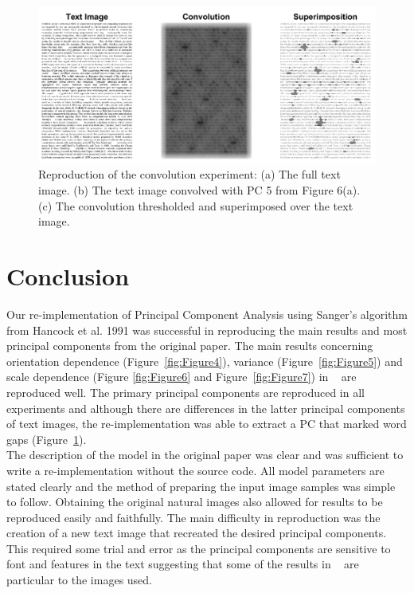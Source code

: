 \begin{figure}
    \centering
    \includegraphics[scale=0.55]{figures/Figure8.png}
    \caption{Reproduction of the convolution experiment: (a) The full text image. (b) The text image convolved with PC 5 from Figure 6(a). (c) The convolution thresholded and superimposed over the text image.}
    \label{fig:Figure8}
\end{figure}

\section{Conclusion}
Our re-implementation of Principal Component Analysis using Sanger's algorithm from Hancock et al. 1991 was successful in reproducing the main results and most principal components from the original paper. The main results concerning orientation dependence (Figure~\ref{fig:Figure4}), variance (Figure~\ref{fig:Figure5}) and scale dependence (Figure \ref{fig:Figure6} and Figure~\ref{fig:Figure7}) in ~\cite{Hancock1992-mp} are reproduced well. The primary principal components are reproduced in all experiments and although there are differences in the latter principal components of text images, the re-implementation was able to extract a PC that marked word gaps (Figure~\ref{fig:Figure8}).\\
The description of the model in the original paper was clear and was sufficient to write a re-implementation without the source code. All model parameters are stated clearly and the method of preparing the input image samples was simple to follow. Obtaining the original natural images also allowed for results to be reproduced easily and faithfully. The main difficulty in reproduction was the creation of a new text image that recreated the desired principal components. This required some trial and error as the principal components are sensitive to font and features in the text suggesting that some of the results in ~\cite{Hancock1992-mp} are particular to the images used.
